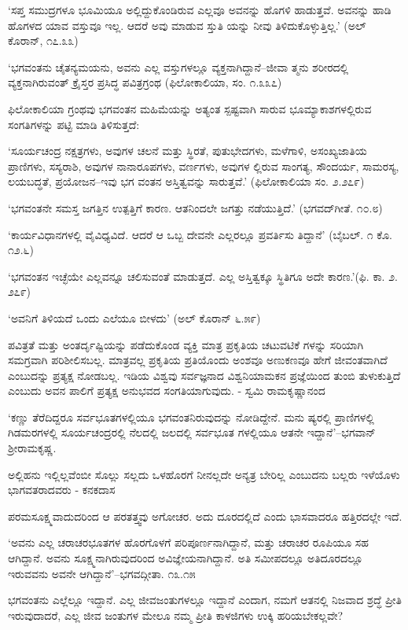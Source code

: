 ‘ಸಪ್ತ ಸಮುದ್ರಗಳೂ ಭೂಮಿಯೂ ಅಲ್ಲಿದ್ದುಕೊಂಡಿರುವ ಎಲ್ಲವೂ ಅವನನ್ನು ಹೊಗಳಿ ಹಾಡುತ್ತವೆ. ಅವನನ್ನು ಹಾಡಿ ಹೊಗಳದ ಯಾವ ವಸ್ತುವೂ ಇಲ್ಲ. ಆದರೆ ಅವು ಮಾಡುವ ಸ್ತುತಿ ಯನ್ನು ನೀವು ತಿಳಿದುಕೊಳ್ಳುತ್ತಿಲ್ಲ.’ (ಅಲ್ ಕೊರಾನ್, ೧೭.೩೩)

‘ಭಗವಂತನು ಚೈತನ್ಯಮಯನು, ಅವನು ಎಲ್ಲ ವಸ್ತುಗಳಲ್ಲೂ ವ್ಯಕ್ತನಾಗಿದ್ದಾನೆ–ಜೀವಾ ತ್ಮನು ಶರೀರದಲ್ಲಿ ವ್ಯಕ್ತನಾಗಿರುವಂತ್ ಕ್ರೈಸ್ತರ ಪ್ರಸಿದ್ಧ ಪವಿತ್ರಗ್ರಂಥ (ಫಿಲೋಕಾಲಿಯಾ, ಸಂ. ೧.೩೩೭)

ಫಿಲೋಕಾಲಿಯಾ ಗ್ರಂಥವು ಭಗವಂತನ ಮಹಿಮೆಯನ್ನು ಅತ್ಯಂತ ಸ್ಪಷ್ಟವಾಗಿ ಸಾರುವ ಭೂಮ್ಯಾಕಾಶಗಳಲ್ಲಿರುವ ಸಂಗತಿಗಳನ್ನು ಪಟ್ಟಿ ಮಾಡಿ ತಿಳಿಸುತ್ತದೆ:

‘ಸೂರ್ಯಚಂದ್ರ ನಕ್ಷತ್ರಗಳು, ಅವುಗಳ ಚಲನೆ ಮತ್ತು ಸ್ಥಿರತೆ, ಪುತುಭೇದಗಳು, ಮಳೆಗಾಳಿ, ಅಸಂಖ್ಯಜಾತಿಯ ಪ್ರಾಣಿಗಳು, ಸಸ್ಯರಾಶಿ, ಅವುಗಳ ನಾನಾರೂಪಗಳು, ವರ್ಣಗಳು, ಅವುಗಳ ಲ್ಲಿರುವ ಸಾಂಗತ್ಯ, ಸೌಂದರ್ಯ, ಸಾಮರಸ್ಯ, ಲಯಬದ್ಧತೆ, ಪ್ರಯೋಜನ–ಇವು ಭಗ ವಂತನ ಅಸ್ತಿತ್ವವನ್ನು ಸಾರುತ್ತವೆ.’ (ಫಿಲೋಕಾಲಿಯಾ ಸಂ. ೨.೨೭೯)

‘ಭಗವಂತನೇ ಸಮಸ್ತ ಜಗತ್ತಿನ ಉತ್ಪತ್ತಿಗೆ ಕಾರಣ. ಆತನಿಂದಲೇ ಜಗತ್ತು ನಡೆಯುತ್ತಿದೆ.’ (ಭಗವದ್​ಗೀತೆ. ೧೦.೮)

‘ಕಾರ್ಯವಿಧಾನಗಳಲ್ಲಿ ವೈವಿಧ್ಯವಿದೆ. ಆದರೆ ಆ ಒಬ್ಬ ದೇವನೇ ಎಲ್ಲರಲ್ಲೂ ಪ್ರವರ್ತಿಸು ತಿದ್ದಾನೆ’ (ಬೈಬಲ್. ೧ ಕೊ. ೧೨.೬)

‘ಭಗವಂತನ ಇಚ್ಛೆಯೇ ಎಲ್ಲವನ್ನೂ ಚಲಿಸುವಂತೆ ಮಾಡುತ್ತದೆ. ಎಲ್ಲ ಅಸ್ತಿತ್ವಕ್ಕೂ ಸ್ಥಿತಿಗೂ ಅದೇ ಕಾರಣ.'(ಫಿ. ಕಾ. ೨. ೨೭೯)

‘ಅವನಿಗೆ ತಿಳಿಯದೆ ಒಂದು ಎಲೆಯೂ ಬೀಳದು’ (ಅಲ್ ಕೊರಾನ್ ೬.೫೯)

ಪವಿತ್ರತೆ ಮತ್ತು ಅಂತರ್ದೃಷ್ಟಿಯನ್ನು ಪಡೆದುಕೊಂಡ ವ್ಯಕ್ತಿ ಮಾತ್ರ ಪ್ರಕೃತಿಯ ಚಟುವಟಿಕೆ ಗಳನ್ನು ಸರಿಯಾಗಿ ಸಮಗ್ರವಾಗಿ ಪರಿಶೀಲಿಸಬಲ್ಲ. ಮಾತ್ರವಲ್ಲ ಪ್ರಕೃತಿಯ ಪ್ರತಿಯೊಂದು ಅಂಶವೂ ಅಣುಕಣವೂ ಹೇಗೆ ಜೀವಂತವಾಗಿದೆ ಎಂಬುದನ್ನು ಪ್ರತ್ಯಕ್ಷ ನೋಡಬಲ್ಲ. ಇಡಿಯ ವಿಶ್ವವು ಸರ್ವಜ್ಞನಾದ ವಿಶ್ವನಿಯಾಮಕನ ಪ್ರಜ್ಞೆಯಿಂದ ತುಂಬಿ ತುಳುಕುತ್ತಿದೆ ಎಂಬುದು ಅವನ ಪಾಲಿಗೆ ಪ್ರತ್ಯಕ್ಷ ಅನುಭವದ ಸಂಗತಿಯಾಗುವುದು. - ಸ್ವಮಿ ರಾಮಕೃಷ್ಣಾನಂದ 

‘ಕಣ್ಣು ತೆರೆದಿದ್ದರೂ ಸರ್ವಭೂತಗಳಲ್ಲಿಯೂ ಭಗವಂತನಿರುವುದನ್ನು ನೋಡಿದ್ದೇನೆ. ಮನು ಷ್ಯರಲ್ಲಿ ಪ್ರಾಣಿಗಳಲ್ಲಿ ಗಿಡಮರಗಳಲ್ಲಿ ಸೂರ್ಯಚಂದ್ರರಲ್ಲಿ ನೆಲದಲ್ಲಿ ಜಲದಲ್ಲಿ ಸರ್ವಭೂತ ಗಳಲ್ಲಿಯೂ ಆತನೇ ಇದ್ದಾನೆ’–ಭಗವಾನ್ ಶ‍್ರೀರಾಮಕೃಷ್ಣ.

ಅಲ್ಲಿಹನು ಇಲ್ಲಿಲ್ಲವೆಂಬೀ ಸೊಲ್ಲು ಸಲ್ಲದು ಒಳಹೊರಗೆ ನೀನಲ್ಲದೇ ಅನ್ಯತ್ರ ಬೇರಿಲ್ಲ ಎಂಬುದನು ಬಲ್ಲರು ಇಳೆಯೊಳು ಭಾಗವತರಾದವರು - ಕನಕದಾಸ 

ಪರಮಸೂಕ್ಷ್ಮವಾದುದರಿಂದ ಆ ಪರತತ್ತ್ವವು ಅಗೋಚರ. ಅದು ದೂರದಲ್ಲಿದೆ ಎಂದು ಭಾಸವಾದರೂ ಹತ್ತಿರದಲ್ಲೇ ಇದೆ.

‘ಅವನು ಎಲ್ಲ ಚರಾಚರಭೂತಗಳ ಹೊರಗೊಳಗೆ ಪರಿಪೂರ್ಣನಾಗಿದ್ದಾನೆ, ಮತ್ತು ಚರಾಚರ ರೂಪಿಯೂ ಸಹ ಆಗಿದ್ದಾನೆ. ಅವನು ಸೂಕ್ಷ್ಮನಾಗಿರುವುದರಿಂದ ಅವಿಜ್ಞೇಯನಾಗಿದ್ದಾನೆ. ಅತಿ ಸಮೀಪದಲ್ಲೂ ಅತಿದೂರದಲ್ಲೂ ಇರುವವನು ಅವನೇ ಆಗಿದ್ದಾನೆ’–ಭಗವದ್ಗೀತಾ. ೧೩.೧೫

ಭಗವಂತನು ಎಲ್ಲೆಲ್ಲೂ ಇದ್ದಾನೆ. ಎಲ್ಲ ಜೀವಜಂತುಗಳಲ್ಲೂ ಇದ್ದಾನೆ ಎಂದಾಗ, ನಮಗೆ ಆತನಲ್ಲಿ ನಿಜವಾದ ಶ್ರದ್ಧೆ ಪ್ರೀತಿ ಇರುವುದಾದರೆ, ಎಲ್ಲ ಜೀವ ಜಂತುಗಳ ಮೇಲೂ ನಮ್ಮ ಪ್ರೀತಿ ಕಾಳಜಿಗಳು ಉಕ್ಕಿ ಹರಿಯಬೇಕಲ್ಲವೇ?

